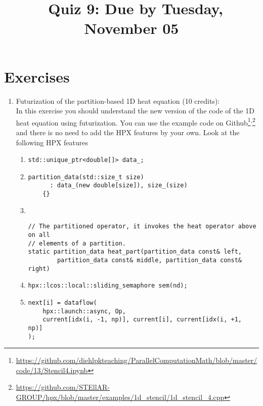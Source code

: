 \documentclass[11pt]{article}
\begin{document}
\title{\coursename~Quiz 9: Due by Tuesday, November 05}
\date{}
\maketitle

\medskip


\section*{Exercises}

\begin{enumerate}
\item Futurization of the partition-based 1D heat equation (10 credits): \\
In this exercise you should understand the new version of the code of the 1D heat equation using futurization. You can use the example code on Github\footnote{\url{https://github.com/diehlpkteaching/ParallelComputationMath/blob/master/code/13/Stencil4.ipynb}}\textsuperscript{,}\footnote{\url{https://github.com/STEllAR-GROUP/hpx/blob/master/examples/1d_stencil/1d_stencil_4.cpp}} and there is no need to add the HPX features by your own. Look at the following HPX features
\begin{enumerate}
\item \lstinline|std::unique_ptr<double[]> data_;|
\item \begin{lstlisting}
partition_data(std::size_t size)
      : data_(new double[size]), size_(size)
    {}
\end{lstlisting} 
\item \textcolor{white}{test}

\begin{lstlisting}
// The partitioned operator, it invokes the heat operator above on all
// elements of a partition.
static partition_data heat_part(partition_data const& left,
        partition_data const& middle, partition_data const& right)
\end{lstlisting}

\item \lstinline|hpx::lcos::local::sliding_semaphore sem(nd);|

\item \begin{lstlisting}
next[i] = dataflow(
    hpx::launch::async, Op,
    current[idx(i, -1, np)], current[i], current[idx(i, +1, np)]
);
\end{lstlisting}


\end{enumerate}
\end{enumerate}
\end{document}
